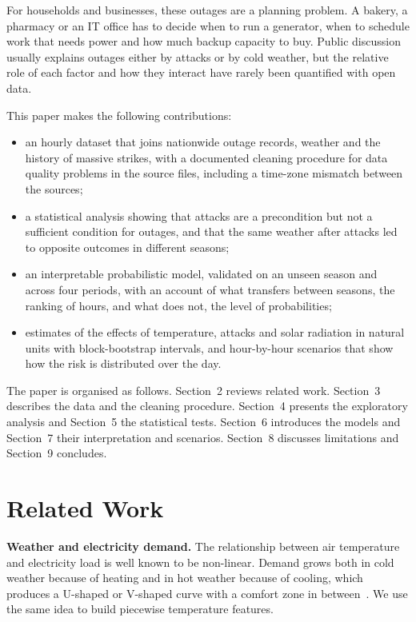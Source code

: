 \documentclass[9pt,twocolumn,letterpaper]{extarticle}
\begin{document}
For households and businesses, these outages are a planning problem. A bakery, a pharmacy or an IT office has to decide when to run a generator, when to schedule work that needs power and how much backup capacity to buy. Public discussion usually explains outages either by attacks or by cold weather, but the relative role of each factor and how they interact have rarely been quantified with open data.

This paper makes the following contributions:
\begin{itemize}
\item an hourly dataset that joins nationwide outage records, weather and the history of massive strikes, with a documented cleaning procedure for data quality problems in the source files, including a time-zone mismatch between the sources;
\item a statistical analysis showing that attacks are a precondition but not a sufficient condition for outages, and that the same weather after attacks led to opposite outcomes in different seasons;
\item an interpretable probabilistic model, validated on an unseen season and across four periods, with an account of what transfers between seasons, the ranking of hours, and what does not, the level of probabilities;
\item estimates of the effects of temperature, attacks and solar radiation in natural units with block-bootstrap intervals, and hour-by-hour scenarios that show how the risk is distributed over the day.
\end{itemize}

The paper is organised as follows. Section~2 reviews related work. Section~3 describes the data and the cleaning procedure. Section~4 presents the exploratory analysis and Section~5 the statistical tests. Section~6 introduces the models and Section~7 their interpretation and scenarios. Section~8 discusses limitations and Section~9 concludes.

\section{Related Work}
\textbf{Weather and electricity demand.} The relationship between air temperature and electricity load is well known to be non-linear. Demand grows both in cold weather because of heating and in hot weather because of cooling, which produces a U-shaped or V-shaped curve with a comfort zone in between~\cite{valor,sailor}. We use the same idea to build piecewise temperature features.
\end{document}
